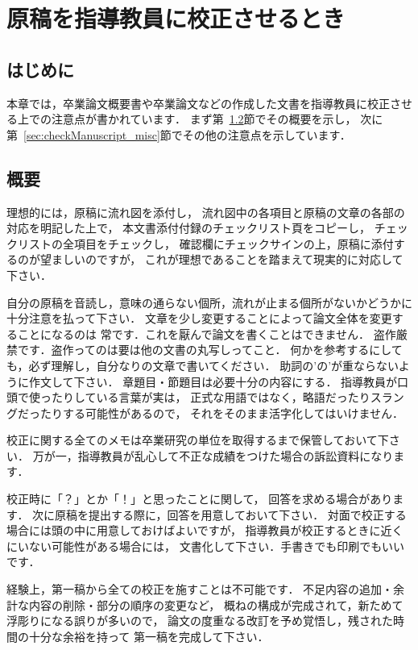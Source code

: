 \documentclass[a4j,12pt,dvipdfmx,oneside]{jsbook}
\theoremstyle{definition}
\begin{document}
\chapter{原稿を指導教員に校正させるとき}\label{chap:checkManuscript}
%
%
%
\section{はじめに}\label{sec:checkManuscript_intro}
本章では，卒業論文概要書や卒業論文などの作成した文書を指導教員に校正させ
る上での注意点が書かれています．
まず第~\ref{sec:checkManuscript_abst}節でその概要を示し，
次に第~\ref{sec:checkManuscript_misc}節でその他の注意点を示しています．
%
%
%
\section{概要}\label{sec:checkManuscript_abst}
理想的には，原稿に流れ図を添付し，
流れ図中の各項目と原稿の文章の各部の対応を明記した上で，
本文書添付付録のチェックリスト頁をコピーし，
チェックリストの全項目をチェックし，
確認欄にチェックサインの上，原稿に添付するのが望ましいのですが，
これが理想であることを踏まえて現実的に対応して下さい．

自分の原稿を音読し，意味の通らない個所，流れが止まる個所がないかどうかに
十分注意を払って下さい．
文章を少し変更することによって論文全体を変更することになるのは
常です．これを厭んで論文を書くことはできません．
盗作厳禁です．盗作ってのは要は他の文書の丸写しってこと．
何かを参考するにしても，必ず理解し，自分なりの文章で書いてください．
助詞の'の'が重ならないように作文して下さい．
章題目・節題目は必要十分の内容にする．
指導教員が口頭で使ったりしている言葉が実は，
正式な用語ではなく，略語だったりスラングだったりする可能性があるので，
それをそのまま活字化してはいけません．

校正に関する全てのメモは卒業研究の単位を取得するまで保管しておいて下さい．
万が一，指導教員が乱心して不正な成績をつけた場合の訴訟資料になります．

校正時に「？」とか「！」と思ったことに関して，
回答を求める場合があります．
次に原稿を提出する際に，回答を用意しておいて下さい．
対面で校正する場合には頭の中に用意しておけばよいですが，
指導教員が校正するときに近くにいない可能性がある場合には，
文書化して下さい．手書きでも印刷でもいいです．

経験上，第一稿から全ての校正を施すことは不可能です．
不足内容の追加・余計な内容の削除・部分の順序の変更など，
概ねの構成が完成されて，新ためて浮彫りになる誤りが多いので，
論文の度重なる改訂を予め覚悟し，残された時間の十分な余裕を持って
第一稿を完成して下さい．
\end{document}
